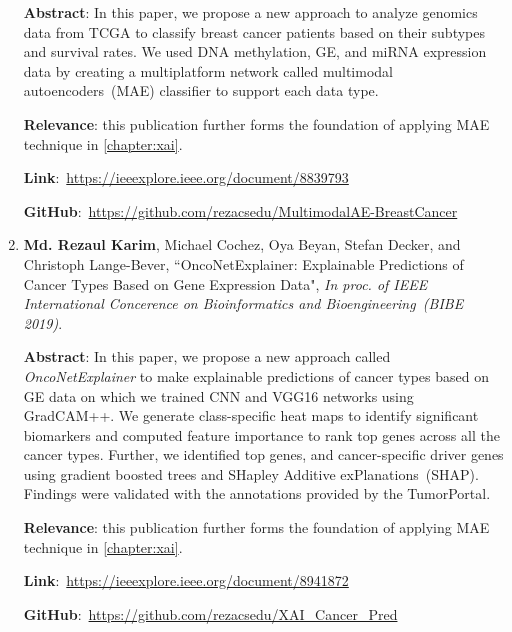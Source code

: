 \begin{enumerate}
	\textbf{Abstract}: In this paper, we propose a new approach to analyze genomics data from TCGA to classify breast cancer patients based on their subtypes and survival rates. We used DNA methylation, GE, and miRNA expression data by creating a multiplatform network called multimodal autoencoders~(MAE) classifier to support each data type.
	
	\textbf{Relevance}: this publication further forms the foundation of applying MAE technique in \cref{chapter:xai}.
	
	\textbf{Link}:~\url{https://ieeexplore.ieee.org/document/8839793}
	
	\textbf{GitHub}:~\url{https://github.com/rezacsedu/MultimodalAE-BreastCancer}
	
	\item \textbf{Md. Rezaul Karim}, Michael Cochez, Oya Beyan, Stefan Decker, and Christoph Lange-Bever, ``OncoNetExplainer: Explainable Predictions of Cancer Types Based on Gene Expression Data", \emph{In proc. of IEEE International Concerence on Bioinformatics and Bioengineering~(BIBE 2019)}.
	
	\textbf{Abstract}: In this paper, we propose a new approach called \emph{OncoNetExplainer} to make explainable predictions of cancer types based on GE data on which we trained CNN and VGG16 networks using GradCAM++. We generate class-specific heat maps to identify significant biomarkers and computed feature importance to rank top genes across all the cancer types. Further, we identified top genes, and cancer-specific driver genes using gradient boosted trees and SHapley Additive exPlanations~(SHAP). Findings were validated with the annotations provided by the TumorPortal. 
	
	\textbf{Relevance}: this publication further forms the foundation of applying MAE technique in \cref{chapter:xai}.
	
	\textbf{Link}:~\url{https://ieeexplore.ieee.org/document/8941872}

	\textbf{GitHub}:~\url{https://github.com/rezacsedu/XAI_Cancer_Pred}
\end{enumerate}



